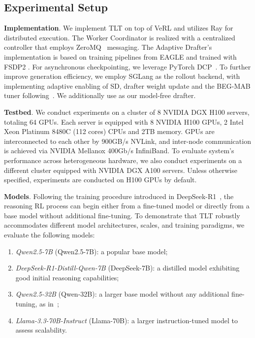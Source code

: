 \documentclass[sigplan,screen]{acmart}
\newcommand{\SysName}{\textrm{TLT}\xspace}
\begin{document}
\subsection{Experimental Setup}
\label{subsec_setup}

\noindent\textbf{Implementation}.
We implement \SysName on top of VeRL \cite{HybridFlow} and utilizes Ray \cite{Ray} for distributed execution. The Worker Coordinator is realized with a centralized controller that employs ZeroMQ~\cite{ZeroMQ} messaging. The Adaptive Drafter's implementation is based on training pipelines from EAGLE and trained with FSDP2 \cite{FSDP2}. For asynchronous checkpointing, we leverage PyTorch DCP~\cite{DCP}. 
To further improve generation efficiency, we employ SGLang \cite{SGLang} as the rollout backend, with implementing adaptive enabling of SD, drafter weight update and the BEG-MAB tuner following~\cite{SGLangMAB}. We additionally use \cite{LookaheadKDD} as our model-free drafter. 

%


\noindent\textbf{Testbed}.
We conduct experiments on a cluster of 8 NVIDIA DGX H100 \cite{dgx-h100}  servers, totaling 64 GPUs. Each server is equipped with 8 NVIDIA H100 GPUs, 2 Intel Xeon Platinum 8480C (112 cores) CPUs and 2TB memory. GPUs are interconnected to each other by 900GB/s NVLink, and inter-node communication is achieved via NVIDIA Mellanox 400Gb/s InfiniBand. To evaluate system's performance across heterogeneous hardware, we also conduct experiments on a different cluster equipped with NVIDIA DGX A100 servers. Unless otherwise specified, experiments are conducted on H100 GPUs by default.



\noindent\textbf{Models}.
Following the training procedure introduced in DeepSeek-R1~\cite{DeepSeekR1}, the reasoning RL process can begin either from a fine-tuned model or directly from a base model without additional fine-tuning. To demonstrate that \SysName robustly accommodates different model architectures, scales, and training paradigms, we evaluate the following models: 

\begin{enumerate}[label=(\arabic*),topsep=0pt,itemsep=0pt,parsep=0pt,leftmargin=20pt]
    \item \emph{Qwen2.5-7B} (Qwen2.5-7B): a popular base model;
    \item \emph{DeepSeek-R1-Distill-Qwen-7B} (DeepSeek-7B): a distilled model exhibiting good initial reasoning capabilities; 
    \item \emph{Qwen2.5-32B} (Qwen-32B): a larger base model without any additional fine-tuning, as in~\cite{DAPO}; 
    \item \emph{Llama-3.3-70B-Instruct} (Llama-70B): a larger instruction-tuned model to assess scalability.
\end{enumerate}
\end{document}
